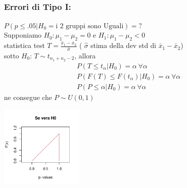 \documentclass[xcolor={pdftex,dvipsnames,table}]{beamer}
\begin{document}
\subsection{}
\begin{frame}
\frametitle{Errori di Tipo I:}

$P(p\leq .05 | H_0=\textrm{i 2 gruppi sono Uguali})=?$\\
Supponiamo $H_0: \mu_1-\mu_2=0$ e $H_1: \mu_1-\mu_2<0$\\
statistica test $T=\frac{\bar{x}_1-\bar{x}_2}{\hat{\sigma}}$ ( $\hat{\sigma}$ stima della dev std di $\bar{x}_1-\bar{x}_2$)\\
sotto $H_0$: $T\sim t_{n_1+n_2-2}$, allora\\
\begin{eqnarray*}
P(T\leq t_\alpha | H_0) =\alpha \ \forall \alpha\\
P(F(T)\leq F(t_\alpha) | H_0) =\alpha \ \forall \alpha\\
P(P \leq \alpha | H_0) =\alpha \ \forall \alpha
\end{eqnarray*}
ne consegue che $P\sim U(0,1)$
\begin{center}
\includegraphics[width=0.3\textwidth]{plaatjes/cdf_uniform}      
\end{center}

\end{frame}
\end{document}
